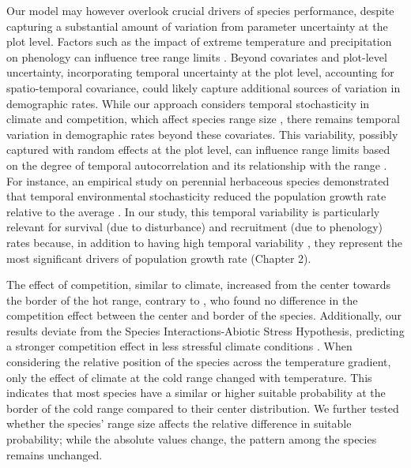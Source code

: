 Our model may however overlook crucial drivers of species performance,
despite capturing a substantial amount of variation from parameter
uncertainty at the plot level. Factors such as the impact of extreme
temperature and precipitation on phenology can influence tree range
limits \citep{Morin2007}. Beyond covariates and plot-level uncertainty,
incorporating temporal uncertainty at the plot level, accounting for
spatio-temporal covariance, could likely capture additional sources of
variation in demographic rates. While our approach considers temporal
stochasticity in climate and competition, which affect species range
size \citep{Holt2022}, there remains temporal variation in demographic
rates beyond these covariates. This variability, possibly captured with
random effects at the plot level, can influence range limits based on
the degree of temporal autocorrelation and its relationship with the
range \citep{Benning2022}. For instance, an empirical study on perennial
herbaceous species demonstrated that temporal environmental
stochasticity reduced the population growth rate relative to the average
\citep{Crone2016}. In our study, this temporal variability is
particularly relevant for survival (due to disturbance) and recruitment
(due to phenology) rates because, in addition to having high temporal
variability \citep{Clark1999a, Leite2023}, they represent the most
significant drivers of population growth rate (Chapter 2).

The effect of competition, similar to climate, increased from the center
towards the border of the hot range, contrary to \citet{Kunstler2021},
who found no difference in the competition effect between the center and
border of the species. Additionally, our results deviate from the
Species Interactions-Abiotic Stress Hypothesis, predicting a stronger
competition effect in less stressful climate conditions
\citep{Louthan2015}. When considering the relative position of the
species across the temperature gradient, only the effect of climate at
the cold range changed with temperature. This indicates that most
species have a similar or higher suitable probability at the border of
the cold range compared to their center distribution. We further tested
whether the species' range size affects the relative difference in
suitable probability; while the absolute values change, the pattern
among the species remains unchanged.

